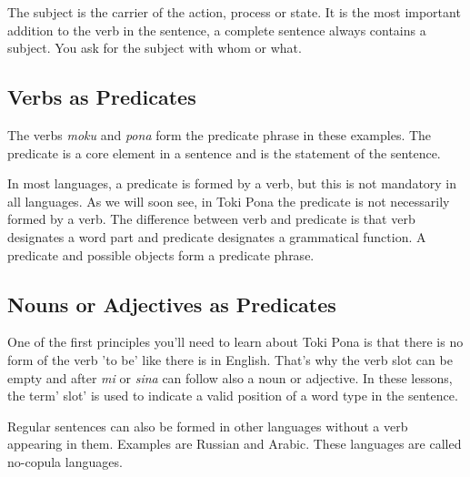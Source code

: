 The subject is the carrier of the action, process or state. 
It is the most important addition to the verb in the sentence, a complete sentence always contains a subject. 
You ask for the subject with whom or what.

%
\subsection*{Verbs as Predicates}
%

The verbs \textit{moku} and \textit{pona} form the predicate phrase in these examples.  
The predicate is a core element in a sentence and is the statement of the sentence. 

In most languages, a predicate is formed by a verb, but this is not mandatory in all languages. 
As we will soon see, in Toki Pona the predicate is not necessarily formed by a verb. 
The difference between verb and predicate is that verb designates a word part and predicate designates a grammatical function.
A predicate and possible objects form a predicate phrase. 
%
\subsection*{Nouns or Adjectives as Predicates}
%
%
%
One of the first principles you'll need to learn about Toki Pona is that there is no form of the verb 'to be' like there is in English. 
That's why the verb slot can be empty and after \textit{mi} or \textit{sina} can follow also a noun or adjective. 
In these lessons, the term' slot' is used to indicate a valid position of a word type in the sentence.

Regular sentences can also be formed in other languages without a verb appearing in them. 
Examples are Russian and Arabic. 
These languages are called no-copula languages.

